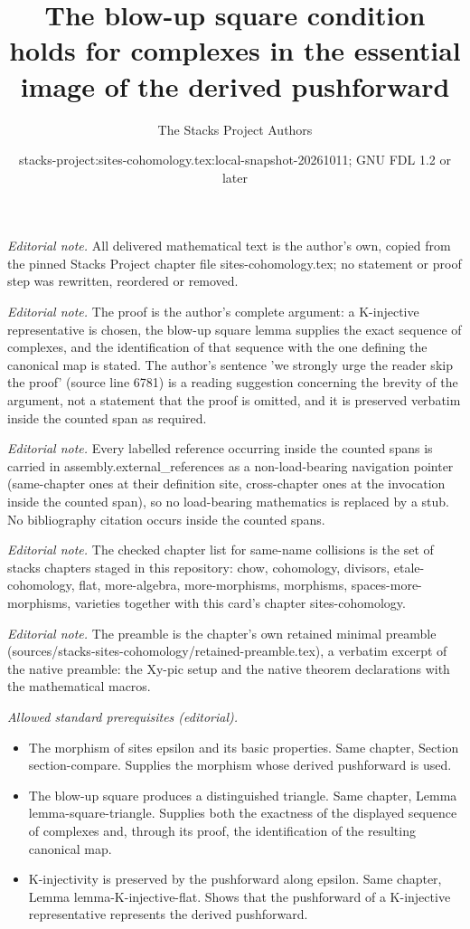 \documentclass[10pt,a4paper]{amsart}
\title{The blow-up square condition holds for complexes in the essential image of the derived pushforward}
\author{The Stacks Project Authors}
\date{stacks-project:sites-cohomology.tex:local-snapshot-20261011; GNU FDL 1.2 or later}
\theoremstyle{plain}
\theoremstyle{definition}
\theoremstyle{remark}
\numberwithin{equation}{subsection}
\begin{document}
\maketitle
\noindent\textit{Editorial note.} All delivered mathematical text is the author's own, copied from the pinned Stacks Project chapter file sites-cohomology.tex; no statement or proof step was rewritten, reordered or removed.\par\medskip
\noindent\textit{Editorial note.} The proof is the author's complete argument: a K-injective representative is chosen, the blow-up square lemma supplies the exact sequence of complexes, and the identification of that sequence with the one defining the canonical map is stated. The author's sentence 'we strongly urge the reader skip the proof' (source line 6781) is a reading suggestion concerning the brevity of the argument, not a statement that the proof is omitted, and it is preserved verbatim inside the counted span as required.\par\medskip
\noindent\textit{Editorial note.} Every labelled reference occurring inside the counted spans is carried in assembly.external\_references as a non-load-bearing navigation pointer (same-chapter ones at their definition site, cross-chapter ones at the invocation inside the counted span), so no load-bearing mathematics is replaced by a stub. No bibliography citation occurs inside the counted spans.\par\medskip
\noindent\textit{Editorial note.} The checked chapter list for same-name collisions is the set of stacks chapters staged in this repository: chow, cohomology, divisors, etale-cohomology, flat, more-algebra, more-morphisms, morphisms, spaces-more-morphisms, varieties together with this card's chapter sites-cohomology.\par\medskip
\noindent\textit{Editorial note.} The preamble is the chapter's own retained minimal preamble (sources/stacks-sites-cohomology/retained-preamble.tex), a verbatim excerpt of the native preamble: the Xy-pic setup and the native theorem declarations with the mathematical macros.\par\medskip
\noindent\textit{Allowed standard prerequisites (editorial).}\begin{itemize}
\item The morphism of sites epsilon and its basic properties. Same chapter, Section section-compare. Supplies the morphism whose derived pushforward is used.
\item The blow-up square produces a distinguished triangle. Same chapter, Lemma lemma-square-triangle. Supplies both the exactness of the displayed sequence of complexes and, through its proof, the identification of the resulting canonical map.
\item K-injectivity is preserved by the pushforward along epsilon. Same chapter, Lemma lemma-K-injective-flat. Shows that the pushforward of a K-injective representative represents the derived pushforward.
\end{itemize}\medskip
\end{document}
